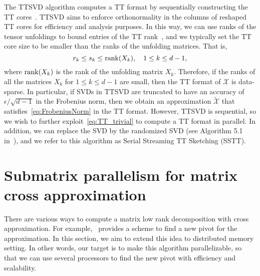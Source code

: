\documentclass[11pt,a4paper,review]{siamart220329}
\newcommand{\rank}{{\rm rank}}
\begin{document}
The TTSVD algorithm computes a TT format by sequentially constructing the TT cores~\cite{oseledets2011tensor}. TTSVD aims to enforce orthonormality in the columns of reshaped TT cores for efficiency and analysis purposes. In this way, we can use ranks of the tensor unfoldings to bound entries of the TT rank~\cite{oseledets2011tensor}, and we typically set the TT core size to be smaller than the ranks of the unfolding matrices. That is,
\begin{equation} \label{eq:TT_trivial}
r_k \le s_k \le {\rm rank}(X_k), \quad 1 \le k \le d-1,
\end{equation}
where $\rank(X_k)$ is the rank of the unfolding matrix $X_k$. Therefore, if the ranks of all the matrices $X_k$ for $1\leq k\leq d-1$ are small, then the TT format of $\mathcal{X}$ is data-sparse. In particular, if SVDs in TTSVD are truncated to have an accuracy of $\epsilon/\sqrt{d-1}$ in the Frobenius norm, then we obtain an approximation $\tilde{\mathcal{X}}$ that satisfies~\cref{eq:FrobeniusNorm} in the TT format. However, TTSVD is sequential, so we wish to further exploit~\cref{eq:TT_trivial} to compute a TT format in parallel. In addition, we can replace the SVD by the randomized SVD (see Algorithm 5.1 in~\cite{che2019randomized}), and we refer to this algorithm as Serial Streaming TT Sketching (SSTT).

\section{Submatrix parallelism for matrix cross approximation}
There are various ways to compute a matrix low rank decomposition with cross approximation. For example,~\cite[Algorithm 2]{dolgov2020parallel} provides a scheme to find a new pivot for the approximation. In this section, we aim to extend this idea to distributed memory setting. In other words, our target is to make this algorithm parallelizable, so that we can use several processors to find the new pivot with efficiency and scalability.
\end{document}
